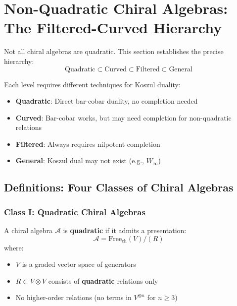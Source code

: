 
\section{Non-Quadratic Chiral Algebras: The Filtered-Curved Hierarchy}
\label{sec:filtered-vs-curved-comprehensive}

Not all chiral algebras are quadratic. This section establishes the precise hierarchy:
\begin{equation}
\boxed{\text{Quadratic} \subset \text{Curved} \subset \text{Filtered} \subset \text{General}}
\end{equation}

Each level requires different techniques for Koszul duality:
\begin{itemize}
\item \textbf{Quadratic}: Direct bar-cobar duality, no completion needed
\item \textbf{Curved}: Bar-cobar works, but may need completion for non-quadratic relations
\item \textbf{Filtered}: Always requires nilpotent completion
\item \textbf{General}: Koszul dual may not exist (e.g., $W_\infty$)
\end{itemize}

\subsection{Definitions: Four Classes of Chiral Algebras}

\subsubsection{Class I: Quadratic Chiral Algebras}

\begin{definition}\label{def:quadratic-chiral}
A chiral algebra $\mathcal{A}$ is \textbf{quadratic} if it admits a presentation:
\begin{equation}
\mathcal{A} = \text{Free}_{\text{ch}}(V) / (R)
\end{equation}
where:
\begin{itemize}
\item $V$ is a graded vector space of generators
\item $R \subset V \otimes V$ consists of \textbf{quadratic} relations only
\item No higher-order relations (no terms in $V^{\otimes n}$ for $n \geq 3$)
\end{itemize}
\end{definition}


